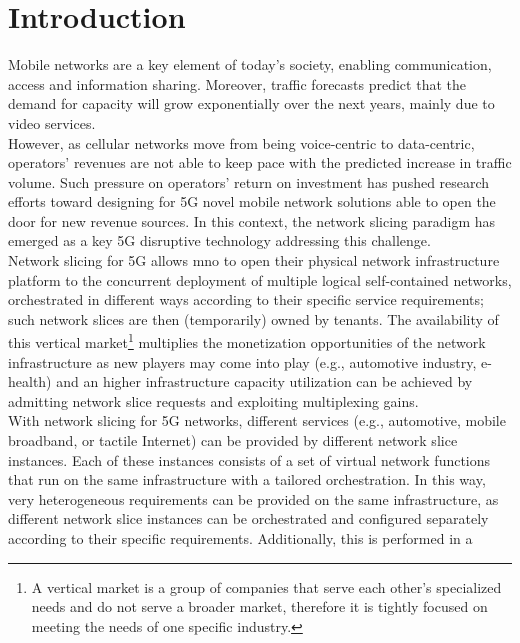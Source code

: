 \documentclass[a4paper,12pt]{report} %
\begin{document}

\newpage
{}
\setcounter{page}{1}
\pagestyle{fancy}
\section{Introduction}
Mobile networks are a key element of today's society, enabling communication, access
and information sharing. Moreover, traffic forecasts predict that the
demand for capacity will grow exponentially over the next years, mainly due to
video services. \\
However, as cellular networks move from being voice-centric to
data-centric, operators' revenues are not able to keep pace with the predicted
increase in traffic volume. Such pressure on operators' return on investment has
pushed research efforts toward designing for 5G novel mobile network solutions
able to open the door for new revenue sources. In this context, the network
slicing paradigm has emerged as a key 5G disruptive technology addressing this
challenge.\\
Network slicing for 5G allows \gls{mno} to open
their physical network infrastructure platform to the concurrent deployment
of multiple logical self-contained networks, orchestrated in different ways according
to their specific service requirements; such network slices are then
(temporarily) owned by tenants. The availability of this vertical market\footnote{A vertical market is a group of companies that serve each other's specialized needs and do not serve a broader market, therefore it is tightly focused on meeting the needs of one specific industry.} multiplies
the monetization opportunities of the network infrastructure as new
players may come into play (e.g., automotive industry, e-health) and an higher
infrastructure capacity utilization can be achieved by admitting network slice
requests and exploiting multiplexing gains.\\
With network slicing for 5G networks, different services (e.g., automotive,
mobile broadband, or tactile Internet) can be provided by different network slice
instances. Each of these instances consists of a set of virtual network functions
that run on the same infrastructure with a tailored orchestration. In this way,
very heterogeneous requirements can be provided on the same infrastructure, as
different network slice instances can be orchestrated and configured separately
according to their specific requirements. Additionally, this is performed in a
\end{document}
